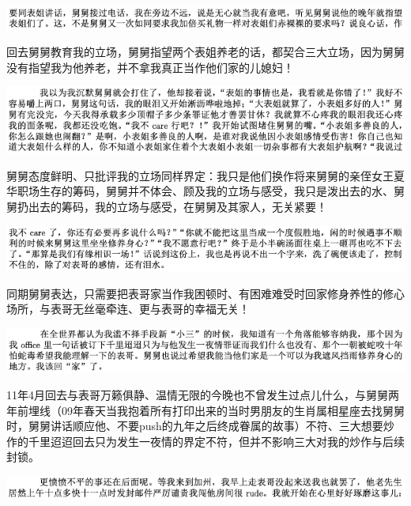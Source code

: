\documentclass[9pt, b5paper]{article}
\begin{document}
\begin{center}
\includegraphics[width=.9\linewidth]{./pic/backups_plans_20210412_171427.png}
\end{center}

回去舅舅教育我的立场，舅舅指望两个表姐养老的话，都契合三大立场，因为舅舅没有指望我为他养老，并不拿我真正当作他们家的儿媳妇！

\begin{center}
\includegraphics[width=.9\linewidth]{./pic/backups_plans_20210412_171555.png}
\end{center}

舅舅态度鲜明、只批评我的立场同样界定：我只是他们换作将来舅舅的亲侄女王夏华职场生存的筹码，舅舅并不体会、顾及我的立场与感受，我只是泼出去的水、舅舅扔出去的筹码，我的立场与感受，在舅舅及其家人，无关紧要！

\begin{center}
\includegraphics[width=.9\linewidth]{./pic/backups_plans_20210412_171513.png}
\end{center}

同期舅舅表达，只需要把表哥家当作我困顿时、有困难难受时回家修身养性的修心场所，与表哥无丝毫牵连、更与表哥的幸福无关！

\begin{center}
\includegraphics[width=.9\linewidth]{./pic/backups_plans_20210412_171721.png}
\end{center}

11年4月回去与表哥万籁俱静、温情无限的今晚也不曾发生过点儿什么，与舅舅两年前埋线（09年春天当我抱着所有打印出来的当时男朋友的生肖属相星座去找舅舅时，舅舅讲话顺应他、不要push的九年之后终成眷属的故事）不符、三大想要炒作的千里迢迢回去只为发生一夜情的界定不符，但并不影响三大对我的炒作与后续封锁。

\begin{center}
\includegraphics[width=.9\linewidth]{./pic/backups_plans_20210412_171817.png}
\end{center}
\end{document}
